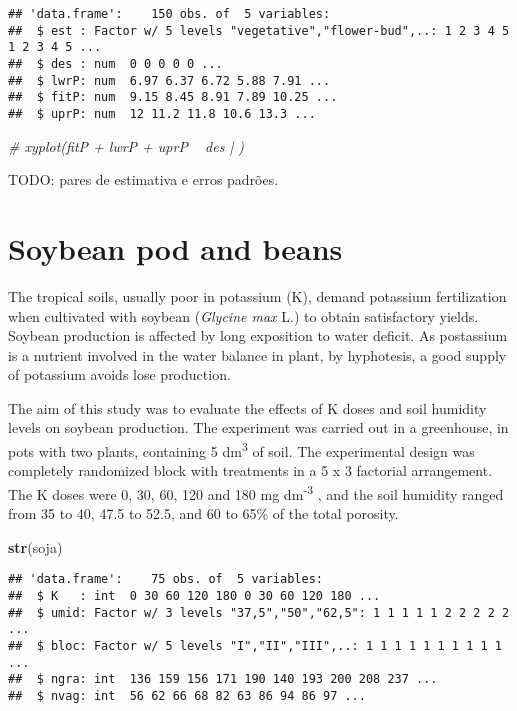 \documentclass[9pt,a5paper,]{book}
\newenvironment{Shaded}{}{}
\newcommand{\KeywordTok}[1]{\textbf{{#1}}}
\newcommand{\CommentTok}[1]{\textit{{#1}}}
\newcommand{\NormalTok}[1]{{#1}}
\renewenvironment{Shaded}{\color{inputcolor}}{}
\theoremstyle{definition}
\theoremstyle{definition}
\theoremstyle{remark}
\begin{document}
\begin{verbatim}
## 'data.frame':    150 obs. of  5 variables:
##  $ est : Factor w/ 5 levels "vegetative","flower-bud",..: 1 2 3 4 5 1 2 3 4 5 ...
##  $ des : num  0 0 0 0 0 ...
##  $ lwrP: num  6.97 6.37 6.72 5.88 7.91 ...
##  $ fitP: num  9.15 8.45 8.91 7.89 10.25 ...
##  $ uprP: num  12 11.2 11.8 10.6 13.3 ...
\end{verbatim}

\begin{Shaded}
\begin{Highlighting}[]
\CommentTok{# xyplot(fitP + lwrP + uprP ~ des | )}
\end{Highlighting}
\end{Shaded}

TODO: pares de estimativa e erros padrões.

\section{Soybean pod and beans}\label{soybean-pod-and-beans}

The tropical soils, usually poor in potassium (K), demand potassium
fertilization when cultivated with soybean (\emph{Glycine max} L.) to
obtain satisfactory yields. Soybean production is affected by long
exposition to water deficit. As postassium is a nutrient involved in the
water balance in plant, by hyphotesis, a good supply of potassium avoids
lose production.

The aim of this study was to evaluate the effects of K doses and soil
humidity levels on soybean production. The experiment was carried out in
a greenhouse, in pots with two plants, containing 5
dm\textsuperscript{3} of soil. The experimental design was completely
randomized block with treatments in a 5 x 3 factorial arrangement. The K
doses were 0, 30, 60, 120 and 180 mg dm\textsuperscript{-3} , and the
soil humidity ranged from 35 to 40, 47.5 to 52.5, and 60 to 65\% of the
total porosity.

\begin{Shaded}
\begin{Highlighting}[]
\KeywordTok{str}\NormalTok{(soja)}
\end{Highlighting}
\end{Shaded}

\begin{verbatim}
## 'data.frame':    75 obs. of  5 variables:
##  $ K   : int  0 30 60 120 180 0 30 60 120 180 ...
##  $ umid: Factor w/ 3 levels "37,5","50","62,5": 1 1 1 1 1 2 2 2 2 2 ...
##  $ bloc: Factor w/ 5 levels "I","II","III",..: 1 1 1 1 1 1 1 1 1 1 ...
##  $ ngra: int  136 159 156 171 190 140 193 200 208 237 ...
##  $ nvag: int  56 62 66 68 82 63 86 94 86 97 ...
\end{verbatim}
\end{document}
